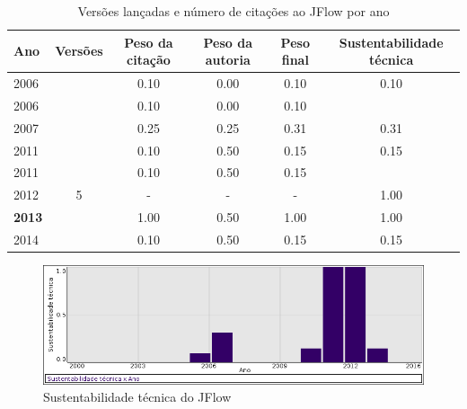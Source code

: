 \begin{table}[H]
\caption{Versões lançadas e número de citações ao JFlow por ano}
\centering
\begin{tabular}{| l | c | c | c | c | c |}
  \hline
  Ano & Versões & Peso da citação & Peso da autoria & Peso final & Sustentabilidade técnica \\
  \hline
            2006
          &
          
          &
          0.10
          &
          0.00
          &
          0.10
          &
            {\color{red} 0.10}
          \\
            2006
          &
          
          &
          0.10
          &
          0.00
          &
          0.10
          &
          \\
\hline
            2007
          &
          
          &
          0.25
          &
          0.25
          &
          0.31
          &
            {\color{red} 0.31}
          \\
\hline
            2011
          &
          
          &
          0.10
          &
          0.50
          &
          0.15
          &
            {\color{red} 0.15}
          \\
            2011
          &
          
          &
          0.10
          &
          0.50
          &
          0.15
          &
          \\
\hline
        2012 & 5 & - & - & -
        &
          {\color{blue} 1.00}
        \\
\hline
            {\bf 2013}
          &
          
          &
          1.00
          &
          0.50
          &
          1.00
          &
            {\color{blue} 1.00}
          \\
\hline
            2014
          &
          
          &
          0.10
          &
          0.50
          &
          0.15
          &
            {\color{red} 0.15}
          \\
\hline
\end{tabular}
\end{table}

\begin{figure}[h]
  \center
  \includegraphics[scale=0.50]{result-documents/charts/jflow.png}
  \caption{Sustentabilidade técnica do JFlow}
\end{figure}


